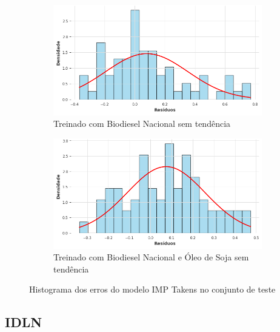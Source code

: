 \begin{figure}[htbp]
	\begin{subfigure}[b]{0.40\textwidth}
		\centering
		\includegraphics[width=\textwidth]{figuras/imp_takens_brasil_detrend_residuals_histogram.png} %
		\caption{Treinado com Biodiesel Nacional sem tendência}
		\label{fig:imp_takens_brasil_detrend_residuals_histogram}
	\end{subfigure}
	\hfill
	\begin{subfigure}[b]{0.40\textwidth}
		\centering
		\includegraphics[width=\textwidth]{figuras/imp_takens_brasil_oil_detrend_residuals_histogram.png} %
		\caption{Treinado com Biodiesel Nacional e Óleo de Soja sem tendência}
		\label{fig:imp_takens_brasil_oil_detrend_residuals_histogram}
	\end{subfigure}

	\caption{Histograma dos erros do modelo \acs{IMP} Takens no conjunto de teste}
	\label{fig:imp_takens_residuals_histogram}
\end{figure}

\subsection{\acs{IDLN}}
